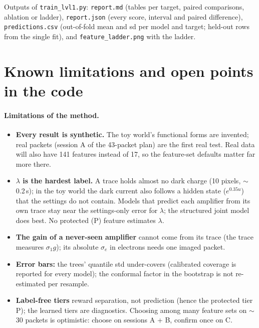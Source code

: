 \documentclass[10pt]{article}
\newcommand{\code}[1]{\texttt{#1}}
\newcommand{\se}{\sigma_e}
\begin{document}
Outputs of \code{train\_lvl1.py}: \code{report.md} (tables per target, paired comparisons, ablation or ladder),
\code{report.json} (every score, interval and paired difference), \code{predictions.csv} (out-of-fold mean and sd per
model and target; held-out rows from the single fit), and \code{feature\_ladder.png} with the ladder.

\section{Known limitations and open points in the code}
\label{sec:limits}

\paragraph{Limitations of the method.}
\begin{itemize}
  \item \textbf{Every result is synthetic.} The toy world's functional forms are invented; real packets (session A of the
        43-packet plan) are the first real test. Real data will also have 141 features instead of 17, so the
        feature-set defaults matter far more there.
  \item \textbf{$\lambda$ is the hardest label.} A trace holds almost no dark charge (10 pixels, $\sim$0.2\,s); in the
        toy world the dark current also follows a hidden state ($e^{0.35u}$) that the settings do not contain. Models that
        predict each amplifier from its own trace stay near the settings-only error for $\lambda$; the structured joint
        model does best. No protected (P) feature estimates $\lambda$.
  \item \textbf{The gain of a never-seen amplifier} cannot come from its trace (the trace measures $\sigma_1 g$); its
        absolute $\se$ in electrons needs one imaged packet.
  \item \textbf{Error bars:} the trees' quantile std under-covers (calibrated coverage is reported for every model); the
        conformal factor in the bootstrap is not re-estimated per resample.
  \item \textbf{Label-free tiers} reward separation, not prediction (hence the protected tier P); the learned tiers are
        diagnostics. Choosing among many feature sets on $\sim$30 packets is optimistic: choose on sessions A + B,
        confirm once on C.
\end{itemize}
\end{document}
